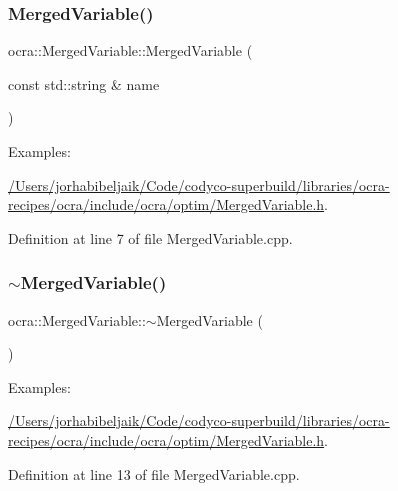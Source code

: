 \subsubsection{\texorpdfstring{Merged\+Variable()}{MergedVariable()}}
{\footnotesize\ttfamily ocra\+::\+Merged\+Variable\+::\+Merged\+Variable (\begin{DoxyParamCaption}\item[{const std\+::string \&}]{name }\end{DoxyParamCaption})}

\begin{Desc}
\item[Examples\+: ]\par
\hyperlink{_2Users_2jorhabibeljaik_2Code_2codyco-superbuild_2libraries_2ocra-recipes_2ocra_2include_2ocra_27dfe52ed2d2fe1904154f5be9150e8b1}{/\+Users/jorhabibeljaik/\+Code/codyco-\/superbuild/libraries/ocra-\/recipes/ocra/include/ocra/optim/\+Merged\+Variable.\+h}.\end{Desc}


Definition at line 7 of file Merged\+Variable.\+cpp.

\hypertarget{classocra_1_1MergedVariable_aa126050631c068dba3e1d12f31dea9ec}{}\label{classocra_1_1MergedVariable_aa126050631c068dba3e1d12f31dea9ec} 
\subsubsection{\texorpdfstring{$\sim$\+Merged\+Variable()}{~MergedVariable()}}
{\footnotesize\ttfamily ocra\+::\+Merged\+Variable\+::$\sim$\+Merged\+Variable (\begin{DoxyParamCaption}{ }\end{DoxyParamCaption})}

\begin{Desc}
\item[Examples\+: ]\par
\hyperlink{_2Users_2jorhabibeljaik_2Code_2codyco-superbuild_2libraries_2ocra-recipes_2ocra_2include_2ocra_27dfe52ed2d2fe1904154f5be9150e8b1}{/\+Users/jorhabibeljaik/\+Code/codyco-\/superbuild/libraries/ocra-\/recipes/ocra/include/ocra/optim/\+Merged\+Variable.\+h}.\end{Desc}


Definition at line 13 of file Merged\+Variable.\+cpp.




